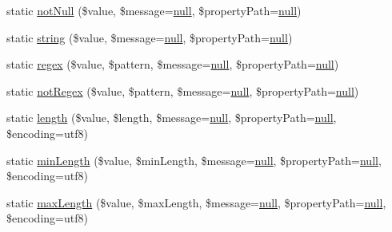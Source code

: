 \begin{DoxyCompactItemize}
\item 
static \mbox{\hyperlink{class_assert_1_1_assertion_aed82afc9263653e898114155dfe19759}{not\+Null}} (\$value, \$message=\mbox{\hyperlink{class_assert_1_1_assertion_af95d8b1582dd619cc0159041bc6892c5}{null}}, \$property\+Path=\mbox{\hyperlink{class_assert_1_1_assertion_af95d8b1582dd619cc0159041bc6892c5}{null}})
\item 
static \mbox{\hyperlink{class_assert_1_1_assertion_aa0a4c5729fb9083a7500e00633661311}{string}} (\$value, \$message=\mbox{\hyperlink{class_assert_1_1_assertion_af95d8b1582dd619cc0159041bc6892c5}{null}}, \$property\+Path=\mbox{\hyperlink{class_assert_1_1_assertion_af95d8b1582dd619cc0159041bc6892c5}{null}})
\item 
static \mbox{\hyperlink{class_assert_1_1_assertion_aa2d81362b9749a5ba6b6500b8bdf2eba}{regex}} (\$value, \$pattern, \$message=\mbox{\hyperlink{class_assert_1_1_assertion_af95d8b1582dd619cc0159041bc6892c5}{null}}, \$property\+Path=\mbox{\hyperlink{class_assert_1_1_assertion_af95d8b1582dd619cc0159041bc6892c5}{null}})
\item 
static \mbox{\hyperlink{class_assert_1_1_assertion_a9a2c67a17cc999ff5b90e08fe2131608}{not\+Regex}} (\$value, \$pattern, \$message=\mbox{\hyperlink{class_assert_1_1_assertion_af95d8b1582dd619cc0159041bc6892c5}{null}}, \$property\+Path=\mbox{\hyperlink{class_assert_1_1_assertion_af95d8b1582dd619cc0159041bc6892c5}{null}})
\item 
static \mbox{\hyperlink{class_assert_1_1_assertion_a01597871a2123a595cc202dcb6f8d7c3}{length}} (\$value, \$length, \$message=\mbox{\hyperlink{class_assert_1_1_assertion_af95d8b1582dd619cc0159041bc6892c5}{null}}, \$property\+Path=\mbox{\hyperlink{class_assert_1_1_assertion_af95d8b1582dd619cc0159041bc6892c5}{null}}, \$encoding=\textquotesingle{}utf8\textquotesingle{})
\item 
static \mbox{\hyperlink{class_assert_1_1_assertion_a736ca1fb9ef01c5a9b681897454f97ad}{min\+Length}} (\$value, \$min\+Length, \$message=\mbox{\hyperlink{class_assert_1_1_assertion_af95d8b1582dd619cc0159041bc6892c5}{null}}, \$property\+Path=\mbox{\hyperlink{class_assert_1_1_assertion_af95d8b1582dd619cc0159041bc6892c5}{null}}, \$encoding=\textquotesingle{}utf8\textquotesingle{})
\item 
static \mbox{\hyperlink{class_assert_1_1_assertion_af2f8972f2c216c9627ee456de9e6841f}{max\+Length}} (\$value, \$max\+Length, \$message=\mbox{\hyperlink{class_assert_1_1_assertion_af95d8b1582dd619cc0159041bc6892c5}{null}}, \$property\+Path=\mbox{\hyperlink{class_assert_1_1_assertion_af95d8b1582dd619cc0159041bc6892c5}{null}}, \$encoding=\textquotesingle{}utf8\textquotesingle{})

\end{DoxyCompactItemize}
